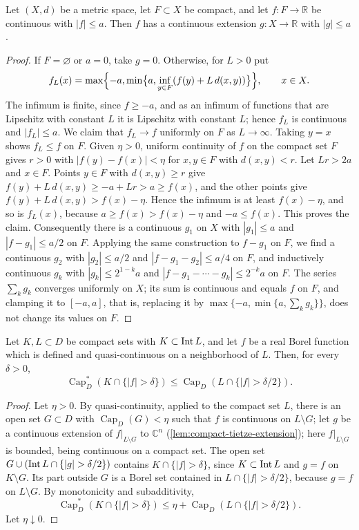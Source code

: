 \begin{lemma}\label{lem:compact-tietze-extension}
Let $(X,d)$ be a metric space, let $F\subset X$ be compact, and let $f\colon F\to\mathbb R$ be continuous with $|f|\le a$. Then $f$ has a continuous extension $g\colon X\to\mathbb R$ with $|g|\le a$.
\end{lemma}
\begin{proof}
If $F=\varnothing$ or $a=0$, take $g=0$. Otherwise, for $L>0$ put
\[
 f_L(x)=\max\Bigl\{-a,\min\bigl\{a,\inf_{y\in F}(f(y)+L\,d(x,y))\bigr\}\Bigr\},\qquad x\in X.
\]
The infimum is finite, since $f\ge-a$, and as an infimum of functions that are Lipschitz with constant $L$ it is Lipschitz with constant $L$; hence $f_L$ is continuous and $|f_L|\le a$. We claim that $f_L\to f$ uniformly on $F$ as $L\to\infty$. Taking $y=x$ shows $f_L\le f$ on $F$. Given $\eta>0$, uniform continuity of $f$ on the compact set $F$ gives $r>0$ with $|f(y)-f(x)|<\eta$ for $x,y\in F$ with $d(x,y)<r$. Let $Lr>2a$ and $x\in F$. Points $y\in F$ with $d(x,y)\ge r$ give $f(y)+L\,d(x,y)\ge-a+Lr>a\ge f(x)$, and the other points give $f(y)+L\,d(x,y)>f(x)-\eta$. Hence the infimum is at least $f(x)-\eta$, and so is $f_L(x)$, because $a\ge f(x)>f(x)-\eta$ and $-a\le f(x)$. This proves the claim. Consequently there is a continuous $g_1$ on $X$ with $|g_1|\le a$ and $|f-g_1|\le a/2$ on $F$. Applying the same construction to $f-g_1$ on $F$, we find a continuous $g_2$ with $|g_2|\le a/2$ and $|f-g_1-g_2|\le a/4$ on $F$, and inductively continuous $g_k$ with $|g_k|\le2^{1-k}a$ and $|f-g_1-\cdots-g_k|\le2^{-k}a$ on $F$. The series $\sum_kg_k$ converges uniformly on $X$; its sum is continuous and equals $f$ on $F$, and clamping it to $[-a,a]$, that is, replacing it by $\max\{-a,\min\{a,\sum_kg_k\}\}$, does not change its values on $F$.
\end{proof}

\begin{lemma}\label{lem:quasi-continuous-level-capacity}
Let $K,L\subset D$ be compact sets with $K\subset\operatorname{Int} L$, and let $f$ be a real Borel function which is defined and quasi-continuous on a neighborhood of $L$. Then, for every $\delta>0$,
\[
 \operatorname{Cap}_D^*(K\cap\{|f|>\delta\})
       \le\operatorname{Cap}_D(L\cap\{|f|>\delta/2\}).
\]
\end{lemma}
\begin{proof}
Let $\eta>0$. By quasi-continuity, applied to the compact set $L$, there is an open set $G\subset D$ with $\operatorname{Cap}_D(G)<\eta$ such that $f$ is continuous on $L\setminus G$; let $g$ be a continuous extension of $f|_{L\setminus G}$ to $\mathbb{C}^n$ (\cref{lem:compact-tietze-extension}); here $f|_{L\setminus G}$ is bounded, being continuous on a compact set. The open set $G\cup(\Int L\cap\{|g|>\delta/2\})$ contains $K\cap\{|f|>\delta\}$, since $K\subset\operatorname{Int} L$ and $g=f$ on $K\setminus G$. Its part outside $G$ is a Borel set contained in $L\cap\{|f|>\delta/2\}$, because $g=f$ on $L\setminus G$. By monotonicity and subadditivity,
\[
 \operatorname{Cap}_D^*(K\cap\{|f|>\delta\})\le\eta+\operatorname{Cap}_D(L\cap\{|f|>\delta/2\}).
\]
Let $\eta\downarrow0$.
\end{proof}

